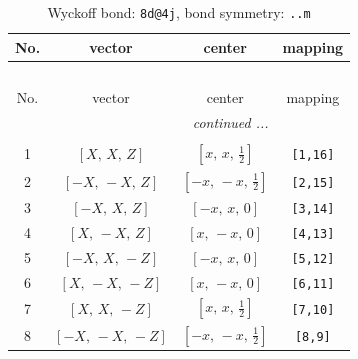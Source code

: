 \documentclass[fleqn,8pt]{jsarticle}
\begin{document}
\begin{longtable}{cccc}
\caption{Wyckoff bond: {\tt 8d@4j}, bond symmetry: {\tt ..m}}
 \\
 \hline \hline
No. & vector & center & mapping \\ \hline \endfirsthead

\multicolumn{3}{l}{\tablename\ \thetable{}} \\
 \hline \hline
No. & vector & center & mapping \\ \hline \endhead

 \hline \hline
\multicolumn{3}{r}{\footnotesize\it continued ...} \\ \endfoot

 \hline \hline
\multicolumn{3}{r}{} \\ \endlastfoot

1 & $\left[ X,\, X,\, Z \right]$ & $\left[ x,\, x,\, \frac{1}{2} \right]$ & {\tt [1,16]} \\ \hline
2 & $\left[ - X,\, - X,\, Z \right]$ & $\left[ - x,\, - x,\, \frac{1}{2} \right]$ & {\tt [2,15]} \\ \hline
3 & $\left[ - X,\, X,\, Z \right]$ & $\left[ - x,\, x,\, 0 \right]$ & {\tt [3,14]} \\ \hline
4 & $\left[ X,\, - X,\, Z \right]$ & $\left[ x,\, - x,\, 0 \right]$ & {\tt [4,13]} \\ \hline
5 & $\left[ - X,\, X,\, - Z \right]$ & $\left[ - x,\, x,\, 0 \right]$ & {\tt [5,12]} \\ \hline
6 & $\left[ X,\, - X,\, - Z \right]$ & $\left[ x,\, - x,\, 0 \right]$ & {\tt [6,11]} \\ \hline
7 & $\left[ X,\, X,\, - Z \right]$ & $\left[ x,\, x,\, \frac{1}{2} \right]$ & {\tt [7,10]} \\ \hline
8 & $\left[ - X,\, - X,\, - Z \right]$ & $\left[ - x,\, - x,\, \frac{1}{2} \right]$ & {\tt [8,9]} \\
\end{longtable}
\renewcommand{\arraystretch}{1.2}
\end{document}
